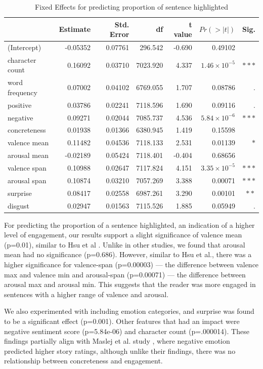 \documentclass[11pt]{article}
\begin{document}
\begin{table}[h]
\centering
\begin{tabular}{|l|r|r|r|r|r|r|}
\hline
& Estimate & Std. Error & df & t value & $Pr(>|t|)$ & Sig. \\
\hline
(Intercept) & -0.05352 & 0.07761 & 296.542 & -0.690 & 0.49102 & \\
character count & 0.16092 & 0.03710 & 7023.920 & 4.337 & $1.46 \times 10^{-5}$ & $\ast\ast\ast$ \\
word frequency & 0.07002 & 0.04102 & 6769.055 & 1.707 & 0.08786 & . \\
positive & 0.03786 & 0.02241 & 7118.596 & 1.690 & 0.09116 & . \\
negative & 0.09271 & 0.02044 & 7085.737 & 4.536 & $5.84 \times 10^{-6}$ & $\ast\ast\ast$ \\
concreteness & 0.01938 & 0.01366 & 6380.945 & 1.419 & 0.15598 & \\
valence mean & 0.11482 & 0.04536 & 7118.133 & 2.531 & 0.01139 & $\ast$ \\
arousal mean & -0.02189 & 0.05424 & 7118.401 & -0.404 & 0.68656 & \\
valence span & 0.10988 & 0.02647 & 7117.824 & 4.151 & $3.35 \times 10^{-5}$ & $\ast\ast\ast$ \\
arousal span & 0.10874 & 0.03210 & 7057.269 & 3.388 & 0.00071 & $\ast\ast\ast$ \\
surprise & 0.08417 & 0.02558 & 6987.261 & 3.290 & 0.00101 & $\ast\ast$ \\
disgust & 0.02947 & 0.01563 & 7115.526 & 1.885 & 0.05949 & . \\
\hline
\end{tabular}
\caption{Fixed Effects for predicting proportion of sentence highlighted}
\label{tab:second}
\end{table}


For predicting the proportion of a sentence highlighted, an indication of a higher level of engagement, our results support a slight significance of valence mean (p=0.01), similar to Hsu et al \citep{HSU201596}. Unlike in other studies, we found that arousal mean had no significance (p=0.686).  However, similar to Hsu et al., there was a higher significance for valence-span (p=0.00003) --- the difference between valence max and valence min and arousal-span (p=0.00071) --- the difference between arousal max and arousal min. This suggests that the reader was more engaged in sentences with a higher range of valence and arousal.

We also experimented with including emotion categories, and surprise was found to be a significant effect (p=0.001). Other features that had an impact were negative sentiment score (p=5.84e-06) and character count (p=.000014). These findings partially align with Maslej et al. study \citep{Maslej2019TheTF}, where negative emotion predicted higher story ratings, although unlike their findings, there was no relationship between concreteness and engagement.
\end{document}
